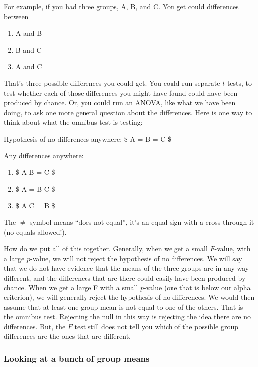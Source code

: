 \documentclass[]{book}
\providecommand{\tightlist}{%
  \setlength{\itemsep}{0pt}\setlength{\parskip}{0pt}}
\begin{document}
For example, if you had three groups, A, B, and C. You get could differences between

\begin{enumerate}
\def\labelenumi{\arabic{enumi}.}
\tightlist
\item
  A and B
\item
  B and C
\item
  A and C
\end{enumerate}

That's three possible differences you could get. You could run separate \(t\)-tests, to test whether each of those differences you might have found could have been produced by chance. Or, you could run an ANOVA, like what we have been doing, to ask one more general question about the differences. Here is one way to think about what the omnibus test is testing:

Hypothesis of no differences anywhere: \$ A = B = C \$

Any differences anywhere:

\begin{enumerate}
\def\labelenumi{\alph{enumi}.}
\tightlist
\item
  \$ A \neq B = C \$
\item
  \$ A = B \neq C \$
\item
  \$ A \neq C = B \$
\end{enumerate}

The \(\neq\) symbol means ``does not equal'', it's an equal sign with a cross through it (no equals allowed!).

How do we put all of this together. Generally, when we get a small \(F\)-value, with a large \(p\)-value, we will not reject the hypothesis of no differences. We will say that we do not have evidence that the means of the three groups are in any way different, and the differences that are there could easily have been produced by chance. When we get a large F with a small \(p\)-value (one that is below our alpha criterion), we will generally reject the hypothesis of no differences. We would then assume that at least one group mean is not equal to one of the others. That is the omnibus test. Rejecting the null in this way is rejecting the idea there are no differences. But, the \(F\) test still does not tell you which of the possible group differences are the ones that are different.

\hypertarget{looking-at-a-bunch-of-group-means}{%
\subsubsection{Looking at a bunch of group means}\label{looking-at-a-bunch-of-group-means}}
\end{document}
